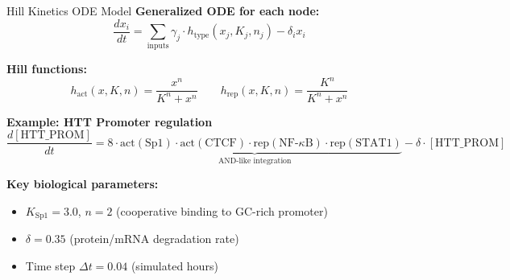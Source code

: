 \documentclass[aspectratio=169,11pt]{beamer}
\begin{document}
\begin{frame}{Hill Kinetics ODE Model}
    \textbf{Generalized ODE for each node:}
    \[
    \frac{dx_i}{dt} = \sum_{\text{inputs}} \gamma_j \cdot h_{\text{type}}(x_j, K_j, n_j) - \delta_i x_i
    \]

    \textbf{Hill functions:}
    \[
    h_{\text{act}}(x, K, n) = \frac{x^n}{K^n + x^n} \qquad
    h_{\text{rep}}(x, K, n) = \frac{K^n}{K^n + x^n}
    \]

    \textbf{Example: HTT Promoter regulation}
    \[
    \frac{d[\text{HTT\_PROM}]}{dt} =
      \underbrace{8 \cdot \text{act}(\text{Sp1}) \cdot \text{act}(\text{CTCF})
                    \cdot \text{rep}(\text{NF-}\kappa\text{B}) \cdot \text{rep}(\text{STAT1})
                 }_{\text{AND-like integration}}
      - \delta \cdot [\text{HTT\_PROM}]
    \]

    \textbf{Key biological parameters:}
    \begin{itemize}
        \item $K_{\text{Sp1}} = 3.0$, $n=2$ (cooperative binding to GC-rich promoter)
        \item $\delta = 0.35$ (protein/mRNA degradation rate)
        \item Time step $\Delta t = 0.04$ (simulated hours)
    \end{itemize}
\end{frame}
\end{document}
